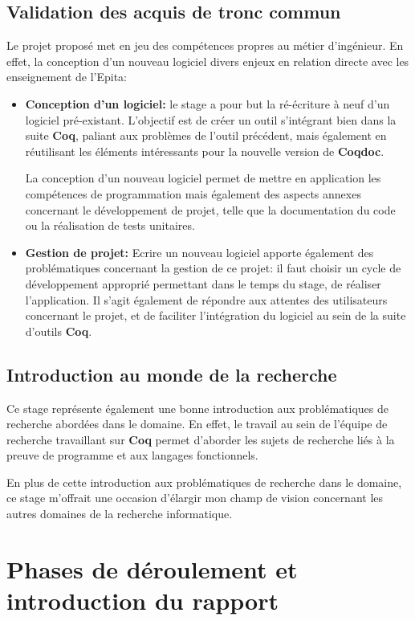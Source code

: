 \documentclass[a4paper, 11pt]{report}
\newcommand{\coq}[0]{\xspace\textbf{Coq}\xspace}
\newcommand{\coqdoc}[0]{\xspace\textbf{Coqdoc}\xspace}
\begin{document}
  \subsection{Validation des acquis de tronc commun}
  Le projet proposé met en jeu des compétences propres au métier d'ingénieur.
  En effet, la conception d'un nouveau logiciel divers enjeux en relation directe
  avec les enseignement de l'Epita:
  \begin{itemize}
    \item \textbf{Conception d'un logiciel:} le stage a pour but la ré-écriture à
      neuf d'un logiciel pré-existant. L'objectif est de créer un outil
      s'intégrant bien dans la suite \coq, paliant aux problèmes de l'outil
      précédent, mais également en réutilisant les éléments intéressants pour
      la nouvelle version de \coqdoc.

      La conception d'un nouveau logiciel permet de mettre en application
      les compétences de programmation mais également des aspects
      annexes concernant le développement de projet, telle que
      la documentation du code ou la réalisation de tests unitaires.
    \item \textbf{Gestion de projet:} Ecrire un nouveau logiciel
      apporte également des problématiques concernant la gestion de
      ce projet: il faut choisir un cycle de développement
      approprié permettant dans le temps du stage, de réaliser
      l'application. Il s'agit également de répondre aux attentes
      des utilisateurs concernant le projet, et de faciliter l'intégration
      du logiciel au sein de la suite d'outils \coq.
  \end{itemize}
  \subsection{Introduction au monde de la recherche}
  Ce stage représente également une bonne introduction aux problématiques
  de recherche abordées dans le domaine. En effet, le travail
  au sein de l'équipe de recherche travaillant sur \coq permet d'aborder les
  sujets de recherche liés à la preuve de programme et aux langages
  fonctionnels.

  En plus de cette introduction aux problématiques de recherche dans le domaine,
  ce stage m'offrait une occasion d'élargir mon champ de vision concernant les
  autres domaines de la recherche informatique.

  \section{Phases de déroulement et introduction du rapport}
\end{document}
